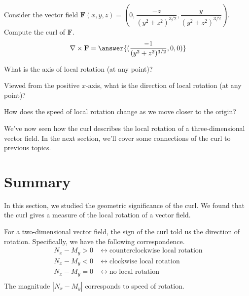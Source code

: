 \documentclass{ximera}
\begin{document}
\begin{problem}
Consider the vector field $\mathbf{F}(x,y,z)=\left(0,\dfrac{-z}{(y^2+z^2)^{3/2}},\dfrac{y}{(y^2+z^2)^{3/2}}\right)$. Compute the curl of $\mathbf{F}$.
\[
\nabla\times\mathbf{F} = \answer{(\frac{-1}{(y^2+z^2)^{3/2}},0,0)}
\]
\begin{problem}
What is the axis of local rotation (at any point)?
\begin{multipleChoice}
\end{multipleChoice}
\begin{problem}
Viewed from the positive $x$-axis, what is the direction of local rotation (at any point)?
\begin{multipleChoice}
\end{multipleChoice}
\begin{problem}
How does the speed of local rotation change as we move closer to the origin?
\begin{multipleChoice}
\end{multipleChoice}
\end{problem}
\end{problem}
\end{problem}
\end{problem}

We've now seen how the curl describes the local rotation of a three-dimensional vector field. In the next section, we'll cover some connections of the curl to previous topics.

\section{Summary}

In this section, we studied the geometric significance of the curl. We found that the curl gives a measure of the local rotation of a vector field.

For a two-dimensional vector field, the sign of the curl told us the direction of rotation. Specifically, we have the following correspondence.
\begin{align*}
N_x-M_y>0\;&\longleftrightarrow\; \textrm{counterclockwise local rotation}\\
N_x-M_y<0\;&\longleftrightarrow\; \textrm{clockwise local rotation}\\
N_x-M_y=0\;&\longleftrightarrow\; \textrm{no local rotation}\\
\end{align*}
The magnitude $|N_x-M_y|$ corresponds to speed of rotation.
\end{document}
